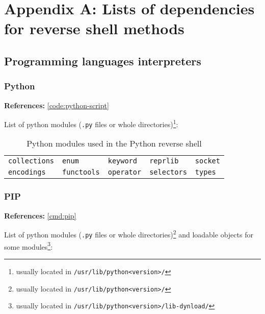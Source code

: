 \newcommand{\references}[1]{\noindent \textbf{References:} \cref{#1}}

\renewcommand{\tablename}{List}
\setlength{\tabcolsep}{15pt}


\chapter*{Appendix A: Lists of dependencies for reverse shell methods}

\section*{Programming languages interpreters}

\subsection*{Python}

\references{code:python-script}

List of python modules (\texttt{.py} files or whole directories)\footnote{usually located in \texttt{/usr/lib/python<version>/}}:

\begin{longtable}{l l l l l}
\caption{Python modules used in the Python reverse shell}\label{tab:python-dpd} \\
\texttt{collections} & \texttt{enum} & \texttt{keyword} & \texttt{reprlib} & \texttt{socket} \\
\texttt{encodings} & \texttt{functools} & \texttt{operator} & \texttt{selectors} & \texttt{types} \\
\end{longtable}


\subsection*{PIP}

\references{cmd:pip}

List of python modules (\texttt{.py} files or whole directories)\footnote{usually located in \texttt{/usr/lib/python<version>/}} and loadable objects for some modules\footnote{usually located in \texttt{/usr/lib/python<version>/lib-dynload/}}:

